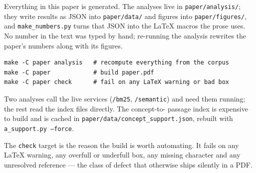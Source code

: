 Everything in this paper is generated. The analyses live in
\texttt{paper/analysis/}; they write results as JSON into
\texttt{paper/data/} and figures into \texttt{paper/figures/}, and
\texttt{make\_numbers.py} turns that JSON into the LaTeX macros the prose
uses. No number in the text was typed by hand; re-running the
analysis rewrites the paper's numbers along with its figures.

\begin{verbatim}
make -C paper analysis   # recompute everything from the corpus
make -C paper            # build paper.pdf
make -C paper check      # fail on any LaTeX warning or bad box
\end{verbatim}

Two analyses call the live services (\texttt{/bm25}, \texttt{/semantic}) and
need them running; the rest read the index files directly. The concept-to-
passage index is expensive to build and is cached in
\texttt{paper/data/concept\_support.json}, rebuilt with
\texttt{a\_support.py --force}.

The \texttt{check} target is the reason the build is worth automating. It
fails on any LaTeX warning, any overfull or underfull box, any missing
character and any unresolved reference --- the class of defect that otherwise
ships silently in a PDF.
